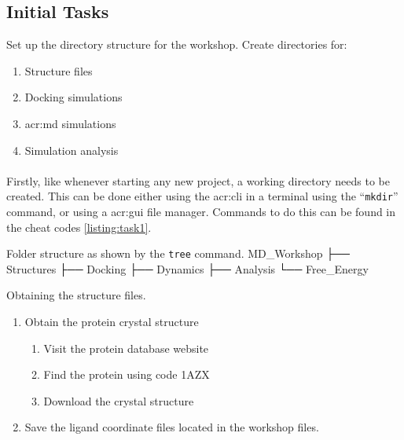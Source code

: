 \subsection{Initial Tasks}
    \begin{task}[label=task:setup]{Set up the directory structure for the workshop.}
    Create directories for:
        \begin{enumerate}[label=(\alph*)]
            \item Structure files
            \item Docking simulations
            \item \gls{acr:md} simulations
            \item Simulation analysis
        \end{enumerate}
    \end{task}

    \paragraph{}
    Firstly, like whenever starting any new project, a working directory needs to be created. This can be done either using the \gls{acr:cli} in a terminal using the \enquote{\texttt{mkdir}} command, or using a \gls{acr:gui} file manager. Commands to do this can be found in the cheat codes \cref{listing:task1}.

\begin{bashoutput}[label=listing:folders]{Folder structure as shown by the \texttt{tree} command.}
    MD_Workshop
    ├── Structures
    ├── Docking
    ├── Dynamics
    ├── Analysis
    └── Free_Energy
\end{bashoutput}
    
    \begin{task}[label=task:Structures]{Obtaining the structure files.}
    \begin{enumerate}[label=(\alph*)]
        \item Obtain the protein crystal structure
        \begin{enumerate}[label=(\roman*)]
            \item Visit the protein database website
            \item Find the protein using code 1AZX
            \item Download the crystal structure
        \end{enumerate}
        \item Save the ligand coordinate files located in the workshop files.
    \end{enumerate}
  \end{task}

